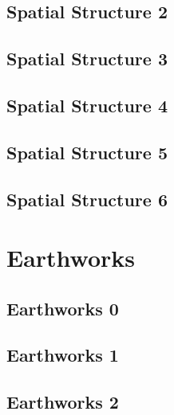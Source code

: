 \documentclass{scrartcl}
\begin{document}
\subsection{Spatial Structure 2}
\label{sec:spatial_2}
\clearpage

\subsection{Spatial Structure 3}
\label{sec:spatial_3}
\clearpage

\subsection{Spatial Structure 4}
\label{sec:spatial_4}
\clearpage

\subsection{Spatial Structure 5}
\label{sec:spatial_5}
\clearpage

\subsection{Spatial Structure 6}
\label{sec:spatial_6}
\clearpage

\section{Earthworks}

\subsection{Earthworks 0}
\label{sec:earthworks_0}
\clearpage

\subsection{Earthworks 1}
\label{sec:earthworks_1}
\clearpage

\subsection{Earthworks 2}
\label{sec:earthworks_2}
\clearpage
\end{document}
